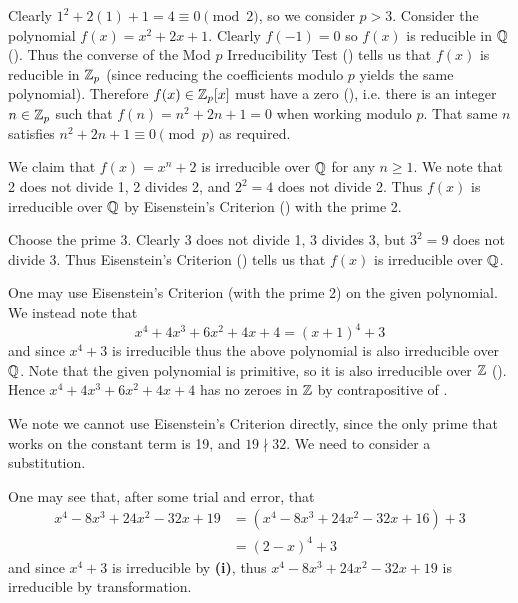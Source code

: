 \begin{questions}
    \item Clearly $1^2 + 2(1) + 1 = 4 \equiv 0 \pmod2$, so we consider $p > 3$. Consider the polynomial $f(x) = x^2 + 2x + 1$. Clearly $f(-1) = 0$ so $f(x)$ is reducible in $\mathbb{Q}$ (). Thus the converse of the Mod $p$ Irreducibility Test () tells us that $f(x)$ is reducible in $\mathbb{Z}_p$ (since reducing the coefficients modulo $p$ yields the same polynomial). Therefore $f(x) \in \mathbb{Z}_p[x]$ must have a zero (), i.e. there is an integer $n \in \mathbb{Z}_p$ such that $f(n) = n^2 + 2n + 1 = 0$ when working modulo $p$. That same $n$ satisfies $n^2 + 2n + 1 \equiv 0 \pmod{p}$ as required.
    
    \item We claim that $f(x) = x^n + 2$ is irreducible over $\mathbb{Q}$ for any $n \geq 1$. We note that 2 does not divide 1, 2 divides 2, and $2^2 = 4$ does not divide 2. Thus $f(x)$ is irreducible over $\mathbb{Q}$ by Eisenstein's Criterion () with the prime 2.

    \item \begin{partquestions}{\roman*}
        \item Choose the prime 3. Clearly 3 does not divide 1, 3 divides 3, but $3^2 = 9$ does not divide 3. Thus Eisenstein's Criterion () tells us that $f(x)$ is irreducible over $\mathbb{Q}$.
        
        \item One may use Eisenstein's Criterion (with the prime 2) on the given polynomial. We instead note that
        \[
            x^4 + 4x^3 + 6x^2 + 4x + 4 = (x+1)^4 + 3
        \]
        and since $x^4 + 3$ is irreducible thus the above polynomial is also irreducible over $\mathbb{Q}$. Note that the given polynomial is primitive, so it is also irreducible over $\mathbb{Z}$ (). Hence $x^4 + 4x^3 + 6x^2 + 4x + 4$ has no zeroes in $\mathbb{Z}$ by contrapositive of .

        \item We note we cannot use Eisenstein's Criterion directly, since the only prime that works on the constant term is 19, and $19 \nmid 32$. We need to consider a substitution.
        
        One may see that, after some trial and error, that
        \begin{align*}
            x^4 - 8x^3 + 24x^2 - 32x + 19 &= (x^4 - 8x^3 + 24x^2 - 32x + 16) + 3\\
            &= (2-x)^4 + 3
        \end{align*}
        and since $x^4 + 3$ is irreducible by \textbf{(i)}, thus $x^4 - 8x^3 + 24x^2 - 32x + 19$ is irreducible by transformation.
    \end{partquestions}


\end{questions}
